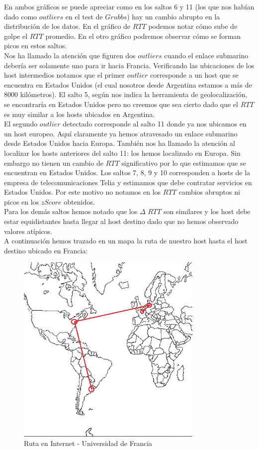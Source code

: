 En ambos gráficos se puede apreciar como en los saltos 6 y 11 (los que nos habían dado como $outliers$ en el test de $Grubbs$) hay un cambio abrupto 
en la distribución de los datos. En el gráfico de $RTT$ podemos notar cómo sube de golpe el $RTT$ promedio. En el otro gráfico podremos observar cómo 
se forman picos en estos saltos.\\

Nos ha llamado la atención que figuren dos $outliers$ cuando el enlace submarino debería ser solamente uno para ir hacia Francia. 
Verificando las ubicaciones de los host intermedios notamos que el primer $outlier$ corresponde a un host que se encuentra en Estados Unidos 
(el cual nosotros desde Argentina estamos a más de 8000 kilómetros). El salto 5, según nos indica la herramienta de geolocalización, se encontraría
en Estados Unidos pero no creemos que sea cierto dado que el $RTT$ es muy similar a los hosts ubicados en Argentina.\\

El segundo $outlier$ detectado corresponde al salto 11 donde ya nos ubicamos en un host europeo. Aquí claramente ya hemos atravesado un 
enlace submarino desde Estados Unidos hacia Europa. También nos ha llamado la atención al localizar los hosts anteriores del salto 11: los hemos 
localizado en Europa. Sin embargo no tienen un cambio de $RTT$ significativo por lo que estimamos que se encuentran en Estados Unidos. Los saltos 7, 8, 9 y 10
corresponden a hosts de la empresa de telecomunicaciones Telia y estimamos que debe contratar servicios en Estados Unidos. Por este motivo no notamos 
en los $RTT$ cambios abruptos ni picos en los $zScore$ obtenidos.\\

Para los demás saltos hemos notado que los $\Delta$ $RTT$ son similares y los host debe estar equidistantes hasta llegar al host destino dado que no 
hemos observado valores atípicos.\\

A continuación hemos trazado en un mapa la ruta de nuestro host hasta el host destino ubicado en Francia:
\begin{figure}[H]
\centering
\includegraphics[width=0.8\textwidth]{graficos/mapa_francia.jpg}
\caption{Ruta en Internet - Universidad de Francia}
\label{francia_zs}
\end{figure}

